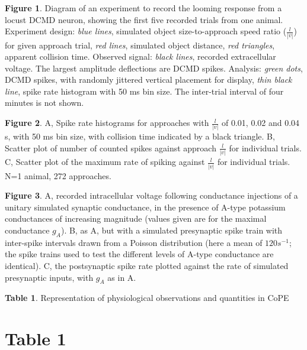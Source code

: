 \documentclass[11pt]{article}
\begin{document}
\textbf{Figure 1}. Diagram of an experiment to record the looming
response from a locust DCMD neuron, showing the first five recorded
trials from one animal. Experiment design: \emph{blue lines},
simulated object size-to-approach speed ratio ($\frac{l}{|v|}$) for
given approach trial, \emph{red lines}, simulated object distance,
\emph{red triangles}, apparent collision time. Observed signal:
\emph{black lines}, recorded extracellular voltage. The largest
amplitude deflections are DCMD spikes. Analysis: \emph{green dots},
DCMD spikes, with randomly jittered vertical placement for display,
\emph{thin black line}, spike rate histogram with 50 ms bin size. The
inter-trial interval of four minutes is not shown.

\flushleft \textbf{Figure 2}. A, Spike rate histograms for approaches with
$\frac{l}{|v|}$ of 0.01, 0.02 and 0.04 s, with 50 ms bin size, with
collision time indicated by a black triangle. B, Scatter plot of
number of counted spikes against approach $\frac{l}{|v|}$ for
individual trials. C, Scatter plot of the maximum rate of spiking
against $\frac{l}{|v|}$ for individual trials. N=1 animal, 272
approaches.

\flushleft \textbf{Figure 3}. A, recorded intracellular voltage following
conductance injections of a unitary simulated synaptic conductance, in
the presence of A-type potassium conductances of increasing magnitude
(values given are for the maximal conductance $g_A$). B, as A, but
with a simulated presynaptic spike train with inter-spike intervals
drawn from a Poisson distribution (here a mean of $120 s^{-1}$; the spike
trains used to test the different levels of A-type conductance are
identical). C, the postsynaptic spike rate plotted against the rate of
simulated presynaptic inputs, with $g_A$ as in A.


%
%
%


\flushleft \textbf{Table 1}. Representation of physiological
observations and quantities in CoPE

\pagebreak
%
\section*{Table 1}
\end{document}
